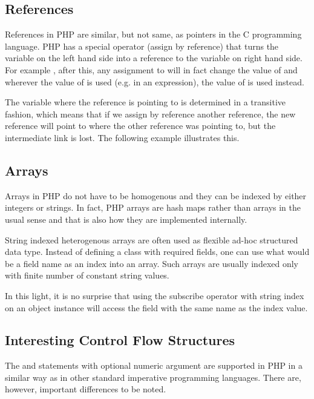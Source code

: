     \subsection{References}
    References in PHP are similar, but not same, as pointers 
    in the C programming language. PHP has a special 
    operator \code{=\&} (assign by reference) that turns 
    the variable on the 
    left hand side into a reference to the 
    variable on right hand side. For example , 
    after this, any assignment 
    to  will in fact change the 
    value of  and wherever 
    the value of  is used (e.g. in an expression), 
    the value of  is used instead.
    
    The variable where the reference is pointing to is determined 
    in a transitive fashion, which means that if we assign 
    by reference another reference, the new reference will 
    point to where the other reference was pointing to, 
    but the intermediate link is lost. The following example 
    illustrates this.
    

    \subsection{Arrays}
    Arrays in PHP do not have to be homogenous and 
    they can be indexed by either integers or strings.
    In fact, PHP arrays are hash maps rather than arrays 
    in the usual sense and that is also how they are 
    implemented internally. 
    
    String indexed heterogenous arrays are often used 
    as flexible ad-hoc structured data type. 
    Instead of defining a class 
    with required fields, one can use what would be a 
    field name as an index into an array. Such arrays 
    are usually indexed only with finite number of 
    constant string values. 
    
    In this light, it is no 
    surprise that using the subscribe operator 
    \code{[]} with string index on an object instance will 
    access the field with the same name as the index value.

    \subsection{Interesting Control Flow Structures}
    The  and  statements with 
    optional numeric argument are supported in PHP in a 
    similar way as in other standard imperative programming 
    languages. There are, however, important differences 
    to be noted.
    
